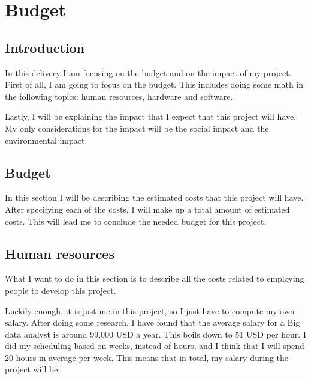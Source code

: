 %
%
%

\section{Budget}

\subsection{Introduction}

In this delivery I am focusing on the budget and on the impact of my project.
First of all, I am going to focus on the budget. This includes doing some math
in the following topics: human resources, hardware and software.

Lastly, I will be explaining the impact that I expect that this project will
have. My only considerations for the impact will be the social impact and the
environmental impact.

\subsection{Budget}

In this section I will be describing the estimated costs that this project will
have. After specifying each of the costs, I will make up a total amount of
estimated costs. This will lead me to conclude the needed budget for this
project.

\subsection{Human resources}

What I want to do in this section is to describe all the costs related to
employing people to develop this project.

Luckily enough, it is just me in this project, so I just have to compute my own
salary. After doing some research, I have found that the average salary for a
Big data analyst is around 99,000 USD a year. This boils down to 51 USD per
hour. I did my scheduling based on weeks, instead of hours, and I think that I
will spend 20 hours in average per week. This means that in total, my salary
during the project will be:

